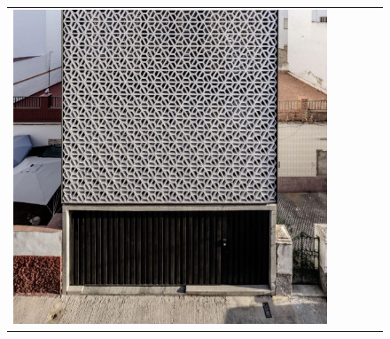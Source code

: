 \begin{figure}[H]
{\begin{tabular}{@{}ccccc@{}}
      \includegraphics[width=\linewidth]{Images/LoRAs/Geleding/Training_images/5.jpg} \\[2pt]


\end{tabular}}
\end{figure}
